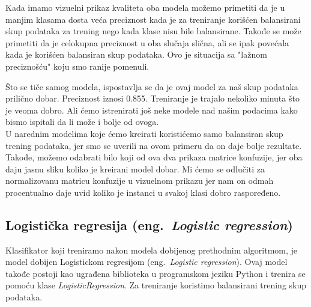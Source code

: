\documentclass[a4paper]{article}
\begin{document}
Kada imamo vizuelni prikaz kvaliteta oba modela možemo primetiti da je u manjim klasama dosta veća preciznost kada je za treniranje korišćen balansirani skup podataka za trening nego kada klase nisu bile balansirane. Takođe se može primetiti da je celokupna preciznost u oba slučaja slična, ali se ipak povećala kada je korišćen balansiran skup podataka. Ovo je situacija sa "lažnom preciznošću" koju smo ranije pomenuli.

Što se tiče samog modela, ispostavlja se da je ovaj model za naš skup podataka prilično dobar. Preciznost iznosi 0.855. Treniranje je trajalo nekoliko minuta što je veoma dobro. Ali ćemo istrenirati još neke modele nad našim podacima kako bismo ispitali da li može i bolje od ovoga. 
\\

U narednim modelima koje ćemo kreirati koristićemo samo balansiran skup trening podataka, jer smo se uverili na ovom primeru da on daje bolje rezultate. Takođe, možemo odabrati bilo koji od ova dva prikaza matrice konfuzije, jer oba daju jasnu sliku koliko je kreirani model dobar. Mi ćemo se odlučiti za normalizovanu matricu konfuzije u vizuelnom prikazu jer nam on odmah procentualno daje uvid koliko je instanci u svakoj klasi dobro raspoređeno.

\subsection{Logistička regresija (eng.~{\em Logistic regression})}
Klasifikator koji treniramo nakon modela dobijenog prethodnim algoritmom, je model dobijen Logistickom regresijom (eng.~{\em Logistic regression}). Ovaj model takođe postoji kao ugrađena biblioteka u programskom jeziku Python i trenira se pomoću klase {\em LogisticRegression}. Za treniranje koristimo balansirani trening skup podataka.
\end{document}
